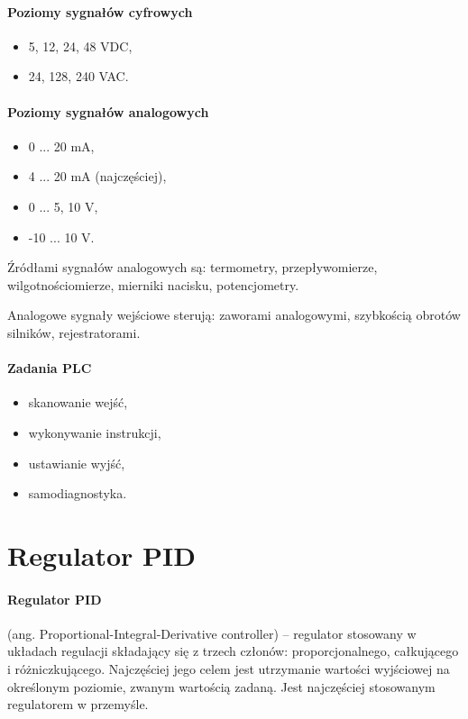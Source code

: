 \documentclass[a4paper,twoside]{report}
\begin{document}
\paragraph{Poziomy sygnałów cyfrowych}
\begin{itemize}
\item 5, 12, 24, 48 VDC,
\item 24, 128, 240 VAC.
\end{itemize}


\paragraph{Poziomy sygnałów analogowych}
\begin{itemize}
\item 0 ... 20 mA,
\item 4 ... 20 mA (najczęściej),
\item 0 ... 5, 10 V,
\item -10 ... 10 V.
\end{itemize}

Źródłami sygnałów analogowych są: termometry, przepływomierze, wilgotnościomierze, mierniki nacisku, potencjometry.

Analogowe sygnały wejściowe sterują: zaworami analogowymi, szybkością obrotów silników, rejestratorami.

\paragraph{Zadania PLC}
\begin{itemize}
\item skanowanie wejść,
\item wykonywanie instrukcji,
\item ustawianie wyjść,
\item samodiagnostyka.
\end{itemize}

\section{Regulator PID}

\paragraph{Regulator PID} (ang. Proportional-Integral-Derivative controller) – regulator stosowany w układach regulacji składający się z trzech członów: proporcjonalnego, całkującego i różniczkującego. Najczęściej jego celem jest utrzymanie wartości wyjściowej na określonym poziomie, zwanym wartością zadaną. Jest najczęściej stosowanym regulatorem w przemyśle.\\
\end{document}
